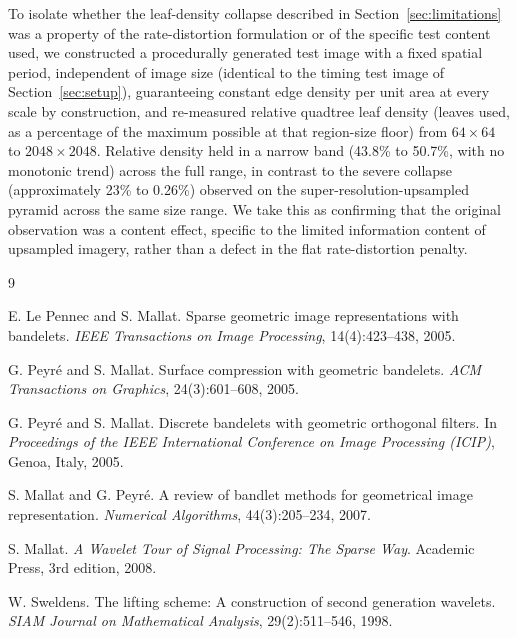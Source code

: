 \documentclass[11pt]{article}
\begin{document}
To isolate whether the leaf-density collapse described in
Section~\ref{sec:limitations} was a property of the rate-distortion
formulation or of the specific test content used, we constructed a
procedurally generated test image with a fixed spatial period, independent
of image size (identical to the timing test image of
Section~\ref{sec:setup}), guaranteeing constant edge density per unit area
at every scale by construction, and re-measured relative quadtree leaf
density (leaves used, as a percentage of the maximum possible at that
region-size floor) from $64\times64$ to $2048\times2048$. Relative density
held in a narrow band (43.8\% to 50.7\%, with no monotonic trend) across the
full range, in contrast to the severe collapse (approximately 23\% to
0.26\%) observed on the super-resolution-upsampled pyramid across the same
size range. We take this as confirming that the original observation was a
content effect, specific to the limited information content of
upsampled imagery, rather than a defect in the flat rate-distortion penalty.

\begin{thebibliography}{9}

E. Le Pennec and S. Mallat.
\newblock Sparse geometric image representations with bandelets.
\newblock \emph{IEEE Transactions on Image Processing}, 14(4):423--438, 2005.

G. Peyr\'e and S. Mallat.
\newblock Surface compression with geometric bandelets.
\newblock \emph{ACM Transactions on Graphics}, 24(3):601--608, 2005.

G. Peyr\'e and S. Mallat.
\newblock Discrete bandelets with geometric orthogonal filters.
\newblock In \emph{Proceedings of the IEEE International Conference on
  Image Processing (ICIP)}, Genoa, Italy, 2005.

S. Mallat and G. Peyr\'e.
\newblock A review of bandlet methods for geometrical image representation.
\newblock \emph{Numerical Algorithms}, 44(3):205--234, 2007.

S. Mallat.
\newblock \emph{A Wavelet Tour of Signal Processing: The Sparse Way}.
\newblock Academic Press, 3rd edition, 2008.

W. Sweldens.
\newblock The lifting scheme: A construction of second generation wavelets.
\newblock \emph{SIAM Journal on Mathematical Analysis}, 29(2):511--546, 1998.

\end{thebibliography}
\end{document}
